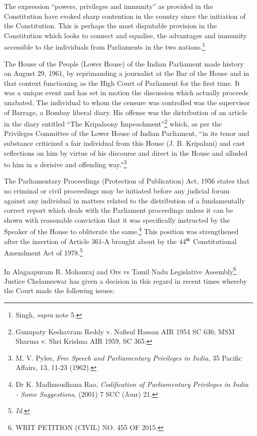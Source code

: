 \begin{multicols}{2}
\noi
The expression “powers, privileges and immunity” as provided in the Constitution have
evoked sharp contention in the country since the initiation of the Constitution. This is perhaps
the most disputable provision in the Constitution which looks to connect and equalise, the
advantages and immunity accessible to the individuals from Parliaments in the two nations.\footnote{Singh, \textit{supra} note 5.}

\noi
The House of the People (Lower House) of the Indian Parliament made history on August 29,
1961, by reprimanding a journalist at the Bar of the House and in that context functioning as
the High Court of Parliament for the first time. It was a unique event and has set in motion
the discussion which actually proceeds unabated. The individual to whom the censure was
controlled was the supervisor of Barrage, a Bombay liberal diary. His offense was the
distribution of an article in the diary entitled “The Kripaloony Impeachment”\footnote{Gunupaty Keshavram Reddy v. Nafisul Hassan AIR 1954 SC 636; MSM Sharma v. Shri Krishna AIR 1959, SC 365.} which, as per
the Privileges Committee of the Lower House of Indian Parliament, “in its tenor and
substance criticized a fair individual from this House (J. B. Kripalani) and cast reflections on
him by virtue of his discourse and direct in the House and alluded to him in a derisive and
offending way.”\footnote{M. V. Pylee, \textit{Free Speech and Parliamentary Privileges in India,} 35 Pacific Affairs, 13, 11-23 (1962).}

\noi
The Parliamentary Proceedings (Protection of Publication) Act, 1956 states that no criminal
or civil proceedings may be initiated before any judicial forum against any individual in
matters related to the distribution of a fundamentally correct report which deals with the
Parliament proceedings unless it can be shown with reasonable conviction that it was
specifically instructed by the Speaker of the House to obliterate the same.\footnote{Dr K. Madhusudhana Rao, \textit{Codification of Parliamentary Privileges in India - Some Suggestions,} (2001) 7 SCC (Jour) 21.} This position was 
strengthened after the insertion of Article 361-A brought about by the 44$^{\rm th}$ Constitutional
Amendment Act of 1978.\footnote{\textit{Id.}}

\noi
In Alagaapuram R. Mohanraj and Ors vs Tamil Nadu Legislative Assembly\footnote{WRIT PETITION (CIVIL) NO. 455 OF 2015.} Justice Chelameswar has given a decision in this regard in recent times whereby the Court made the following issues:


\end{multicols}
